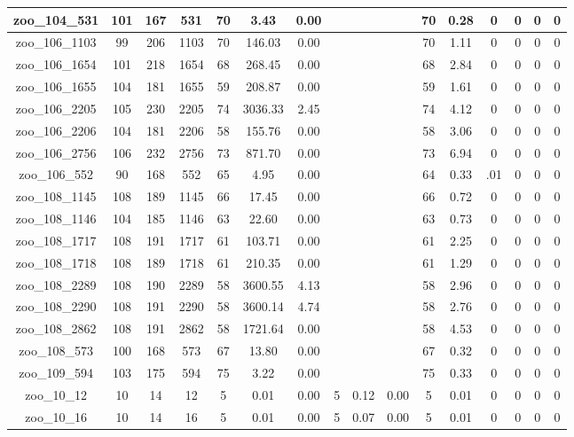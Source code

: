 \begin{landscape}
\begin{longtable}{|c|c|c|c|c|c|c|c|c|c|c|c|c|c|c|c|}
zoo\_104\_531 & 101 & 167 & 531 & 70 & 3.43 & 0.00 &  &  &  & 70 & 0.28 & 0 & 0 & 0 & 0 \\ \hline 
zoo\_106\_1103 & 99 & 206 & 1103 & 70 & 146.03 & 0.00 &  &  &  & 70 & 1.11 & 0 & 0 & 0 & 0 \\ \hline 
zoo\_106\_1654 & 101 & 218 & 1654 & 68 & 268.45 & 0.00 &  &  &  & 68 & 2.84 & 0 & 0 & 0 & 0 \\ \hline 
zoo\_106\_1655 & 104 & 181 & 1655 & 59 & 208.87 & 0.00 &  &  &  & 59 & 1.61 & 0 & 0 & 0 & 0 \\ \hline 
zoo\_106\_2205 & 105 & 230 & 2205 & 74 & 3036.33 & 2.45 &  &  &  & 74 & 4.12 & 0 & 0 & 0 & 0 \\ \hline 
zoo\_106\_2206 & 104 & 181 & 2206 & 58 & 155.76 & 0.00 &  &  &  & 58 & 3.06 & 0 & 0 & 0 & 0 \\ \hline 
zoo\_106\_2756 & 106 & 232 & 2756 & 73 & 871.70 & 0.00 &  &  &  & 73 & 6.94 & 0 & 0 & 0 & 0 \\ \hline 
zoo\_106\_552 & 90 & 168 & 552 & 65 & 4.95 & 0.00 &  &  &  & 64 & 0.33 & .01 & 0 & 0 & 0 \\ \hline 
zoo\_108\_1145 & 108 & 189 & 1145 & 66 & 17.45 & 0.00 &  &  &  & 66 & 0.72 & 0 & 0 & 0 & 0 \\ \hline 
zoo\_108\_1146 & 104 & 185 & 1146 & 63 & 22.60 & 0.00 &  &  &  & 63 & 0.73 & 0 & 0 & 0 & 0 \\ \hline 
zoo\_108\_1717 & 108 & 191 & 1717 & 61 & 103.71 & 0.00 &  &  &  & 61 & 2.25 & 0 & 0 & 0 & 0 \\ \hline 
zoo\_108\_1718 & 108 & 189 & 1718 & 61 & 210.35 & 0.00 &  &  &  & 61 & 1.29 & 0 & 0 & 0 & 0 \\ \hline 
zoo\_108\_2289 & 108 & 190 & 2289 & 58 & 3600.55 & 4.13 &  &  &  & 58 & 2.96 & 0 & 0 & 0 & 0 \\ \hline 
zoo\_108\_2290 & 108 & 191 & 2290 & 58 & 3600.14 & 4.74 &  &  &  & 58 & 2.76 & 0 & 0 & 0 & 0 \\ \hline 
zoo\_108\_2862 & 108 & 191 & 2862 & 58 & 1721.64 & 0.00 &  &  &  & 58 & 4.53 & 0 & 0 & 0 & 0 \\ \hline 
zoo\_108\_573 & 100 & 168 & 573 & 67 & 13.80 & 0.00 &  &  &  & 67 & 0.32 & 0 & 0 & 0 & 0 \\ \hline 
zoo\_109\_594 & 103 & 175 & 594 & 75 & 3.22 & 0.00 &  &  &  & 75 & 0.33 & 0 & 0 & 0 & 0 \\ \hline 
zoo\_10\_12 & 10 & 14 & 12 & 5 & 0.01 & 0.00 & 5 & 0.12 & 0.00 & 5 & 0.01 & 0 & 0 & 0 & 0 \\ \hline 
zoo\_10\_16 & 10 & 14 & 16 & 5 & 0.01 & 0.00 & 5 & 0.07 & 0.00 & 5 & 0.01 & 0 & 0 & 0 & 0 \\ \hline 

\end{longtable}
\end{landscape}
